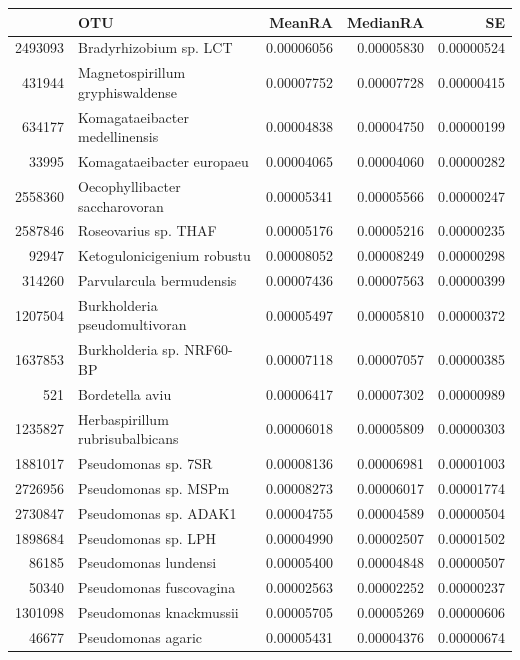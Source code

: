 \begin{table}[ht]
\centering
\begin{tabular}{rlrrr}
  \hline
 & OTU & MeanRA & MedianRA & SE \\ 
  \hline
2493093 & Bradyrhizobium sp. LCT & 0.00006056 & 0.00005830 & 0.00000524 \\ 
  431944 & Magnetospirillum gryphiswaldense & 0.00007752 & 0.00007728 & 0.00000415 \\ 
  634177 & Komagataeibacter medellinensis & 0.00004838 & 0.00004750 & 0.00000199 \\ 
  33995 & Komagataeibacter europaeu & 0.00004065 & 0.00004060 & 0.00000282 \\ 
  2558360 & Oecophyllibacter saccharovoran & 0.00005341 & 0.00005566 & 0.00000247 \\ 
  2587846 & Roseovarius sp. THAF & 0.00005176 & 0.00005216 & 0.00000235 \\ 
  92947 & Ketogulonicigenium robustu & 0.00008052 & 0.00008249 & 0.00000298 \\ 
  314260 & Parvularcula bermudensis & 0.00007436 & 0.00007563 & 0.00000399 \\ 
  1207504 & Burkholderia pseudomultivoran & 0.00005497 & 0.00005810 & 0.00000372 \\ 
  1637853 & Burkholderia sp. NRF60-BP & 0.00007118 & 0.00007057 & 0.00000385 \\ 
  521 & Bordetella aviu & 0.00006417 & 0.00007302 & 0.00000989 \\ 
  1235827 & Herbaspirillum rubrisubalbicans & 0.00006018 & 0.00005809 & 0.00000303 \\ 
  1881017 & Pseudomonas sp. 7SR & 0.00008136 & 0.00006981 & 0.00001003 \\ 
  2726956 & Pseudomonas sp. MSPm & 0.00008273 & 0.00006017 & 0.00001774 \\ 
  2730847 & Pseudomonas sp. ADAK1 & 0.00004755 & 0.00004589 & 0.00000504 \\ 
  1898684 & Pseudomonas sp. LPH & 0.00004990 & 0.00002507 & 0.00001502 \\ 
  86185 & Pseudomonas lundensi & 0.00005400 & 0.00004848 & 0.00000507 \\ 
  50340 & Pseudomonas fuscovagina & 0.00002563 & 0.00002252 & 0.00000237 \\ 
  1301098 & Pseudomonas knackmussii & 0.00005705 & 0.00005269 & 0.00000606 \\ 
  46677 & Pseudomonas agaric & 0.00005431 & 0.00004376 & 0.00000674 \\ 

\end{tabular}
\end{table}
